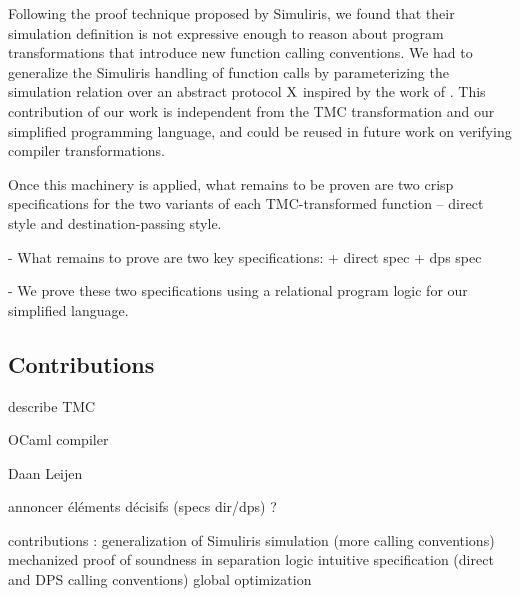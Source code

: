 Following the proof technique proposed by Simuliris, we found that their simulation definition is not expressive enough to reason about program transformations that introduce new function calling conventions. We had to generalize the Simuliris handling of function calls by parameterizing the simulation relation over an abstract protocol $\mathrm{X}$ inspired by the work of \citet*{TODO-paulo}. This contribution of our work is independent from the TMC transformation and our simplified programming language, and could be reused in future work on verifying compiler transformations.

Once this machinery is applied, what remains to be proven are two crisp specifications for the two variants of each TMC-transformed function -- direct style and destination-passing style.

- What remains to prove are two key specifications:
  + direct spec
  + dps spec

- We prove these two specifications using a relational program logic for our simplified language.

\subsection{Contributions}


describe TMC

OCaml compiler

Daan Leijen

annoncer éléments décisifs (specs dir/dps) ?

contributions :
generalization of Simuliris simulation (more calling conventions)
mechanized proof of soundness in separation logic
intuitive specification (direct and DPS calling conventions)
global optimization




